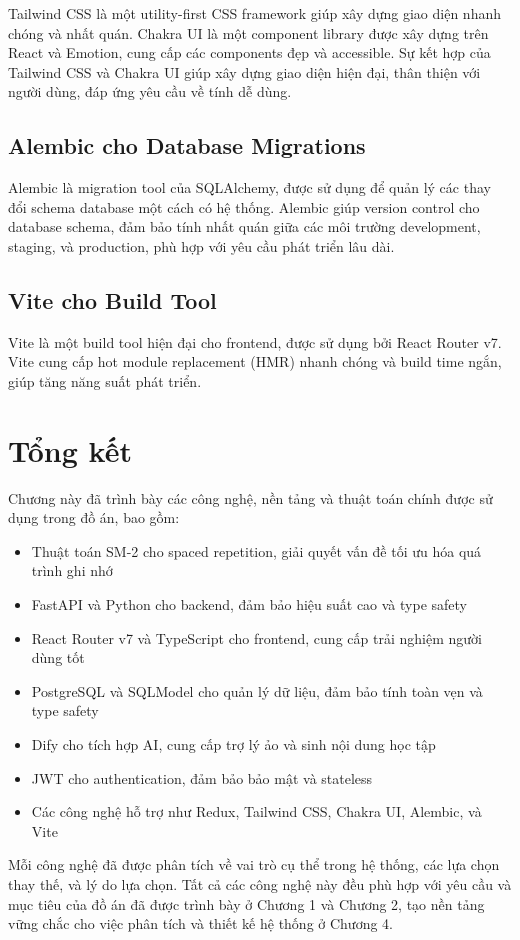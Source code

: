 \documentclass[../DoAn.tex]{subfiles}
\begin{document}
Tailwind CSS là một utility-first CSS framework giúp xây dựng giao diện nhanh chóng và nhất quán. Chakra UI là một component library được xây dựng trên React và Emotion, cung cấp các components đẹp và accessible. Sự kết hợp của Tailwind CSS và Chakra UI giúp xây dựng giao diện hiện đại, thân thiện với người dùng, đáp ứng yêu cầu về tính dễ dùng.

\subsection{Alembic cho Database Migrations}

Alembic là migration tool của SQLAlchemy, được sử dụng để quản lý các thay đổi schema database một cách có hệ thống. Alembic giúp version control cho database schema, đảm bảo tính nhất quán giữa các môi trường development, staging, và production, phù hợp với yêu cầu phát triển lâu dài.

\subsection{Vite cho Build Tool}

Vite là một build tool hiện đại cho frontend, được sử dụng bởi React Router v7. Vite cung cấp hot module replacement (HMR) nhanh chóng và build time ngắn, giúp tăng năng suất phát triển.

\section{Tổng kết}
\label{section:3.8}

Chương này đã trình bày các công nghệ, nền tảng và thuật toán chính được sử dụng trong đồ án, bao gồm:

\begin{itemize}
    \item Thuật toán SM-2 cho spaced repetition, giải quyết vấn đề tối ưu hóa quá trình ghi nhớ
    \item FastAPI và Python cho backend, đảm bảo hiệu suất cao và type safety
    \item React Router v7 và TypeScript cho frontend, cung cấp trải nghiệm người dùng tốt
    \item PostgreSQL và SQLModel cho quản lý dữ liệu, đảm bảo tính toàn vẹn và type safety
    \item Dify cho tích hợp AI, cung cấp trợ lý ảo và sinh nội dung học tập
    \item JWT cho authentication, đảm bảo bảo mật và stateless
    \item Các công nghệ hỗ trợ như Redux, Tailwind CSS, Chakra UI, Alembic, và Vite
\end{itemize}

Mỗi công nghệ đã được phân tích về vai trò cụ thể trong hệ thống, các lựa chọn thay thế, và lý do lựa chọn. Tất cả các công nghệ này đều phù hợp với yêu cầu và mục tiêu của đồ án đã được trình bày ở Chương 1 và Chương 2, tạo nền tảng vững chắc cho việc phân tích và thiết kế hệ thống ở Chương 4.
\end{document}
